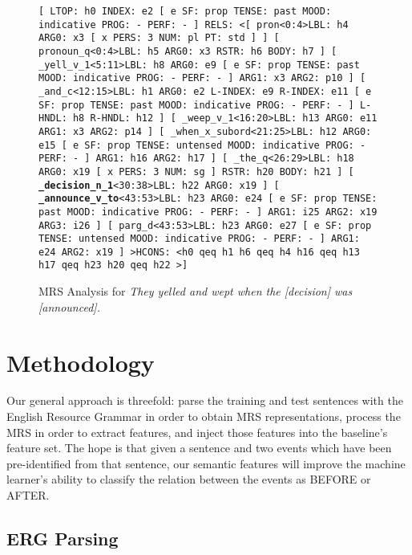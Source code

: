 \documentclass[11pt]{article}
\begin{document}
\begin{figure*}[t]
{\small \texttt{[ LTOP: h0 INDEX: e2 [ e SF: prop TENSE: past MOOD: indicative PROG: - PERF: - ] RELS: \textless [ pron\textless0:4\textgreater LBL: h4 ARG0: x3 [ x PERS: 3 NUM: pl PT: std ] ]  [ pronoun\_q\textless0:4\textgreater LBL: h5 ARG0: x3 RSTR: h6 BODY: h7 ]  [ \_yell\_v\_1\textless5:11\textgreater LBL: h8 ARG0: e9 [ e SF: prop TENSE: past MOOD: indicative PROG: - PERF: - ] ARG1: x3 ARG2: p10 ]  [ \_and\_c\textless12:15\textgreater LBL: h1 ARG0: e2 L-INDEX: e9 R-INDEX: e11 [ e SF: prop TENSE: past MOOD: indicative PROG: - PERF: - ] L-HNDL: h8 R-HNDL: h12 ]  [ \_weep\_v\_1\textless16:20\textgreater LBL: h13 ARG0: e11 ARG1: x3 ARG2: p14 ]  [ \_when\_x\_subord\textless21:25\textgreater LBL: h12 ARG0: e15 [ e SF: prop TENSE: untensed MOOD: indicative PROG: - PERF: - ] ARG1: h16 ARG2: h17 ]  [ \_the\_q\textless26:29\textgreater LBL: h18 ARG0: x19 [ x PERS: 3 NUM: sg ] RSTR: h20 BODY: h21 ]  [ \textbf{\_decision\_n\_1}\textless30:38\textgreater LBL: h22 ARG0: x19 ]  [ \textbf{\_announce\_v\_to}\textless43:53\textgreater LBL: h23 ARG0: e24 [ e SF: prop TENSE: past MOOD: indicative PROG: - PERF: - ] ARG1: i25 ARG2: x19 ARG3: i26 ]  [ parg\_d\textless43:53\textgreater LBL: h23 ARG0: e27 [ e SF: prop TENSE: untensed MOOD: indicative PROG: - PERF: - ] ARG1: e24 ARG2: x19 ] \textgreater HCONS: \textless h0 qeq h1 h6 qeq h4 h16 qeq h13 h17 qeq h23 h20 qeq h22 \textgreater ]}}
   
\caption{MRS Analysis for \emph{They yelled and wept when the [decision] was [announced].} \label{mrs}}
\end{figure*}

\section{Methodology}
\label{methodology}

Our general approach is threefold: parse the training and test sentences with the English Resource Grammar \cite{Flickinger:00} in order to obtain MRS representations, process the MRS in order to extract features, and inject those features into the baseline's feature set. The hope is that given a sentence and two events which have been pre-identified from that sentence, our semantic features will improve the machine learner's ability to classify the relation between the events as BEFORE or AFTER.


\subsection{ERG Parsing}
\end{document}
